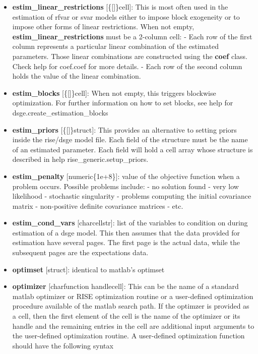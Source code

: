 \documentclass[letterpaper,10pt,english]{sphinxmanual}
\begin{document}
\begin{itemize}
\item {} 
\textbf{estim\_linear\_restrictions} {[}\{{[}{]}\}\textbar{}cell{]}: This is most often used in
the estimation of rfvar or svar models either to impose block
exogeneity or to impose other forms of linear restrictions. When not
empty, \textbf{estim\_linear\_restrictions} must be a 2-column cell:
- Each row of the first column represents a particular linear
combination of the estimated parameters. Those linear combinations are
constructed using the \textbf{coef} class. Check help for coef.coef for more
details.
- Each row of the second column holds the value of the linear
combination.

\item {} 
\textbf{estim\_blocks} {[}\{{[}{]}\}\textbar{}cell{]}: When not empty, this triggers blockwise
optimization. For further information on how to set blocks, see help
for dsge.create\_estimation\_blocks

\item {} 
\textbf{estim\_priors} {[}\{{[}{]}\}\textbar{}struct{]}: This provides an alternative to
setting priors inside the rise/dsge model file. Each field of the
structure must be the name of an estimated parameter. Each field will
hold a cell array whose structure is described in help
rise\_generic.setup\_priors.

\item {} 
\textbf{estim\_penalty} {[}numeric\textbar{}\{1e+8\}{]}: value of the objective function
when a problem occurs. Possible problems include:
- no solution found
- very low likelihood
- stochastic singularity
- problems computing the initial covariance matrix
- non-positive definite covariance matrices
- etc.

\item {} 
\textbf{estim\_cond\_vars} {[}char\textbar{}cellstr{]}: list of the variables to condition
on during estimation of a dsge model. This then assumes that the data
provided for estimation have several pages. The first page is the
actual data, while the subsequent pages are the expectations data.

\item {} 
\textbf{optimset} {[}struct{]}: identical to matlab's optimset

\item {} 
\textbf{optimizer} {[}char\textbar{}function handle\textbar{}cell{]}: This can be the name of a
standard matlab optimizer or RISE optimization routine or a
user-defined optimization procedure available of the matlab search
path. If the optimzer is provided as a cell, then the first element of
the cell is the name of the optimizer or its handle and the remaining
entries in the cell are additional input arguments to the user-defined
optimization routine. A user-defined optimization function should have
the following syntax


\end{itemize}
\end{document}
